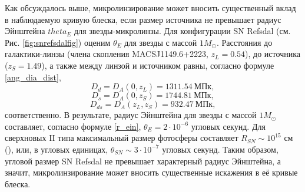 Как обсуждалось выше, микролинзирование может вносить существенный вклад в наблюдаемую кривую блеска, если размер источника не превышает радиус Эйнштейна $theta_E$ для звезды-микролинзы. Для конфигурации SN Refsdal (см. Рис. \ref{fig:snrefsdalfig}) оценим $\theta_E$ для звезды с массой $1 M_{\odot}$. Расстояния до галактики-линзы (члена скопления MACSJ1149.6+2223, $z_L=0.54$), до источника ($z_S=1.49$), а также между линзой и источником равны, согласно формуле \eqref{ang_dia_dist}, 
$$ D_d=D_A(0,z_L)=1311.54 \ \textrm{МПк}, $$
$$ D_s=D_A(0,z_S)=1744.81 \ \textrm{МПк}, $$
$$ D_{ds}=D_A(z_L,z_S)=932.47 \ \textrm{МПк}, $$
соответственно. В результате, радиус Эйнштейна для звезды с массой $1 M_{\odot}$ составляет, согласно формуле \eqref{r_ein}, $\theta_E = 2 \cdot 10^{-6}$ угловых секунд. Для сверхновых II типа максимальный размер фотосферы составляет $R_{SN} \sim 10^{15}$ см (\cite{razmer}), или, в угловых единицах, $\theta_{SN} \sim 3 \cdot 10^{-7}$ угловых секунд. Таким образом, угловой размер SN Refsdal не превышает характерный радиус Эйнштейна, а значит, микролинзирование может вносить существенные искажения в её кривые блеска.